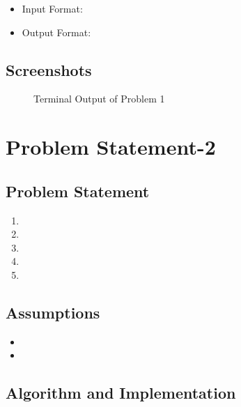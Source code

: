 \documentclass[12pt]{article}
\begin{document}
			\begin{itemize}
				\item Input Format:\\
				\item Output Format:\\ 
			\end{itemize}
		
		\subsection{Screenshots}
		
			\begin{figure}[h!]
				\centering
				\caption{Terminal Output of Problem 1}
			\end{figure}
	
	\section{Problem Statement-2}
	
		\subsection{Problem Statement}
			\begin{figure}[h!]
				\centering
			\end{figure}
			
			\begin{enumerate}
				\item 
				\item 
				\item 
				\item 
				\item 
			\end{enumerate}
		
		\subsection{Assumptions}
		
			\begin{itemize}
				\item 
				\item 
			\end{itemize}
		
		\subsection{Algorithm and Implementation~\cite{}}
		
\end{document}
